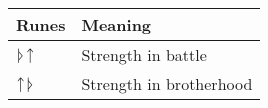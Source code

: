 \documentclass{article}
\begin{document}
\centering
\begin{tabular}{|l|l|}
\hline
\textbf{Runes} & \textbf{Meaning} \\ \hline
ᚦᛏ	& Strength in battle \\ \hline
ᛏᚦ	& Strength in brotherhood \\ \hline
\end{tabular}
\end{document}

